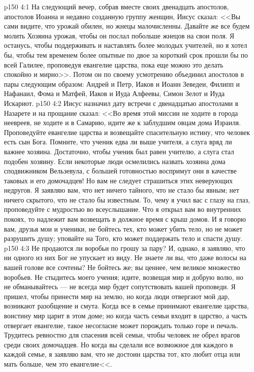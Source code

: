 \vs p150 4:1 На следующий вечер, собрав вместе своих двенадцать апостолов, апостолов Иоанна и недавно созданную группу женщин, Иисус сказал: <<Вы сами видите, что урожай обилен, но жнецы малочисленны. Давайте же все будем молить Хозяина урожая, чтобы он послал побольше жнецов на свои поля. Я останусь, чтобы поддерживать и наставлять более молодых учителей, но я хотел бы, чтобы тем временем более опытные по двое за короткий срок прошли бы по всей Галилее, проповедуя евангелие царства, пока еще можно это делать спокойно и мирно>>. Потом он по своему усмотрению объединил апостолов в пары следующим образом: Андрей и Петр, Иаков и Иоанн Зеведеи, Филипп и Нафанаил, Фома и Матфей, Иаков и Иуда Алфеевы, Симон Зелот и Иуда Искариот.
\vs p150 4:2 Иисус назначил дату встречи с двенадцатью апостолами в Назарете и на прощание сказал: <<Во время этой миссии не ходите в города неевреев, не ходите и в Самарию, идите же к заблудшим овцам дома Израиля. Проповедуйте евангелие царства и возвещайте спасительную истину, что человек есть сын Бога. Помните, что ученик едва ли выше учителя, а слуга вряд ли важнее хозяина. Достаточно, чтобы ученик был равен учителю, а слуга стал подобен хозяину. Если некоторые люди осмелились назвать хозяина дома сподвижником Вельзевула, с большей готовностью воспримут они в качестве таковых и его домочадцев! Но вам не следует страшиться этих неверующих недругов. Я заявляю вам, что нет ничего тайного, что не стало бы явным; нет ничего скрытого, что не стало бы известным. То, чему я учил вас с глазу на глаз, проповедуйте с мудростью во всеуслышание. Что я открыл вам во внутренних покоях, то надлежит вам возвещать в должное время с крыш домов. И я говорю вам, друзья мои и ученики, не бойтесь тех, кто может убить тело, но не может разрушить душу; уповайте на Того, кто может поддержать тело и спасти душу.
\vs p150 4:3 Не продаются ли воробьи по грошу за пару? И, однако, я заявляю, что ни одного из них Бог не упускает из виду. Не знаете ли вы, что даже волосы на вашей голове все сочтены? Не бойтесь же; вы ценнее, чем великое множество воробьев. Не стыдитесь моего учения; идите, возвещая мир и добрую волю, но не обманывайтесь --- не всегда мир будет сопутствовать вашей проповеди. Я пришел, чтобы принести мир на землю, но когда люди отвергают мой дар, возникают разобщение и смута. Когда все в семье принимают евангелие царства, воистину мир царит в этом доме; но когда часть семьи входит в царство, а часть отвергает евангелие, такое несогласие может порождать только горе и печаль. Трудитесь ревностно для спасения всей семьи, чтобы человек не обрел врагов среди своих домочадцев. Но когда вы сделали все возможное для каждого в каждой семье, я заявляю вам, что не достоин царства тот, кто любит отца или мать больше, чем это евангелие<<.
